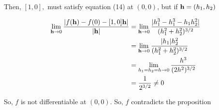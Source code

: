 \documentclass{article}
\begin{document}
Then,  $[1,0],$ must satisfy equation (14) at $(0,0)$, but if $\vb{h}=
(h_1,h_2)$

\begin{align*}
  \lim_{\vb{h}\rightarrow 0} \frac{|f(\vb{h})-f(0)
  -[1,0]\vb{h}|}{|\vb{h}|}  &= \lim_{\vb{h}\rightarrow 0} \frac{|h_1^3
        -h_1^3 -h_1h_2^2|}{(h_1^2+h_2^2)^{3/2}}\\
          &= \lim_{\vb{h}\rightarrow 0}
            \frac{|h_1|h_2^2}{(h_1^2+h_2^2)^{3/2}}\\
            &= \lim_{h_1=h_2 = h \rightarrow 0}
              \frac{h^3}{(2h^2)^{3/2}}\\
              &=
                \frac{1}{2^{3/2}}\neq 0
\end{align*}

So, $f$ is not differentiable at $(0,0)$. So, $f$ contradicts the
proposition \textdbend
\end{document}
